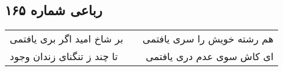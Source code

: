 \begin{center}
\section*{رباعی شماره ۱۶۵}
\label{sec:sh165}
\begin{longtable}{l p{0.5cm} r}
بر شاخ امید اگر بری یافتمی
&&
هم رشته خویش را سری یافتمی
\\
تا چند ز تنگنای زندان وجود
&&
ای کاش سوی عدم دری یافتمی
\\
\end{longtable}
\end{center}
